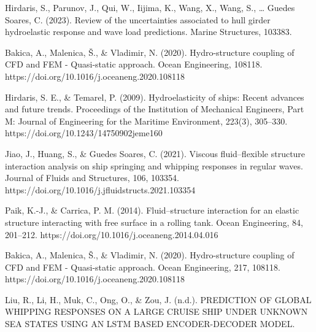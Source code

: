 \documentclass[12pt]{article} %
\begin{document}
\begin{thebibliography}{99}

    Hirdaris, S., Parunov, J., Qui, W., Iijima, K., Wang, X., Wang, S., … Guedes Soares, C. (2023). Review of the uncertainties associated to hull girder hydroelastic response and wave load predictions. Marine Structures, 103383. 

    Bakica, A., Malenica, Š., \& Vladimir, N. (2020). Hydro-structure coupling of CFD and FEM - Quasi-static approach. Ocean Engineering, 108118. https://doi.org/10.1016/j.oceaneng.2020.108118
    
    Hirdaris, S. E., \& Temarel, P. (2009). Hydroelasticity of ships: Recent advances and future trends. Proceedings of the Institution of Mechanical Engineers, Part M: Journal of Engineering for the Maritime Environment, 223(3), 305–330. https://doi.org/10.1243/14750902jeme160
    
    Jiao, J., Huang, S., \& Guedes Soares, C. (2021). Viscous fluid–flexible structure interaction analysis on ship springing and whipping responses in regular waves. Journal of Fluids and Structures, 106, 103354. https://doi.org/10.1016/j.jfluidstructs.2021.103354
    
    Paik, K.-J., \& Carrica, P. M. (2014). Fluid–structure interaction for an elastic structure interacting with free surface in a rolling tank. Ocean Engineering, 84, 201–212. https://doi.org/10.1016/j.oceaneng.2014.04.016
    
    Bakica, A., Malenica, Š., \& Vladimir, N. (2020). Hydro-structure coupling of CFD and FEM - Quasi-static approach. Ocean Engineering, 217, 108118. https://doi.org/10.1016/j.oceaneng.2020.108118
    
    Liu, R., Li, H., Muk, C., Ong, O., \& Zou, J. (n.d.). PREDICTION OF GLOBAL WHIPPING RESPONSES ON A LARGE CRUISE SHIP UNDER UNKNOWN SEA STATES USING AN LSTM BASED ENCODER-DECODER MODEL.
\end{thebibliography}
\end{document}
